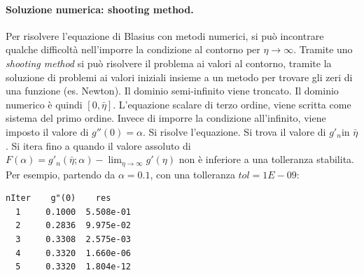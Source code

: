 \paragraph{Soluzione numerica: shooting method.}
Per risolvere l'equazione di Blasius con metodi numerici, si può incontrare qualche difficoltà
nell'imporre la condizione al contorno per $\eta \to \infty$.
Tramite uno \textit{shooting method} si può risolvere il problema ai valori al contorno, tramite 
la soluzione di problemi ai valori iniziali insieme a un metodo per trovare gli zeri di una
funzione (es. Newton).
Il dominio semi-infinito viene troncato. Il dominio numerico è quindi $[0,\bar{\eta}]$. L'equazione 
scalare di terzo ordine, viene scritta come sistema del primo ordine. Invece di imporre la condizione
all'infinito, viene imposto il valore di $g''(0)=\alpha$. Si risolve l'equazione. Si trova il valore di $g'_n$in $\bar{\eta}$.
Si itera fino a quando il valore assoluto di $F(\alpha) = g'_n(\bar{\eta};\alpha) - \lim_{\eta\to \infty} g'(\eta)$ non è inferiore 
a una tolleranza stabilita.
%
Per esempio, partendo da $\alpha=0.1$, con una tolleranza $tol = 1E-09$:
\begin{center}
\begin{verbatim}
nIter    g"(0)    res 
  1     0.1000  5.508e-01 
  2     0.2836  9.975e-02 
  3     0.3308  2.575e-03 
  4     0.3320  1.660e-06 
  5     0.3320  1.804e-12
\end{verbatim}
\end{center}
    


